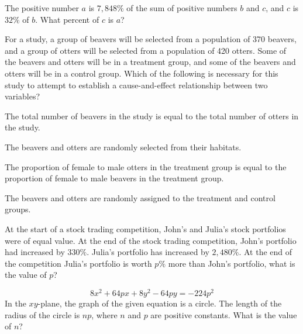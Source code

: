 \vfill
\clearpage
\noindent\begin{minipage}{\linewidth}
\par\smallskip
The positive number $a$ is $7{,}848\%$ of the sum of positive numbers $b$ and $c$, and $c$ is $32\%$ of $b$. What percent of $c$ is $a$?
\end{minipage}
\vfill
\noindent\begin{minipage}{\linewidth}
\par\smallskip
For a study, a group of beavers will be selected from a population of 370 beavers, and a group of otters will be selected from a population of 420 otters. Some of the beavers and otters will be in a treatment group, and some of the beavers and otters will be in a control group. Which of the following is necessary for this study to attempt to establish a cause-and-effect relationship between two variables?
\begin{satchoices}
  \item[A)] The total number of beavers in the study is equal to the total number of otters in the study.
  \item[B)] The beavers and otters are randomly selected from their habitats.
  \item[C)] The proportion of female to male otters in the treatment group is equal to the proportion of female to male beavers in the treatment group.
  \item[D)] The beavers and otters are randomly assigned to the treatment and control groups.
\end{satchoices}
\end{minipage}
\vfill
\noindent\begin{minipage}{\linewidth}
\par\smallskip
At the start of a stock trading competition, John's and Julia's stock portfolios were of equal value. At the end of the stock trading competition, John's portfolio had increased by $330\%$. Julia's portfolio has increased by $2{,}480\%$. At the end of the competition Julia's portfolio is worth $p\%$ more than John's portfolio, what is the value of $p$?
\end{minipage}
\vfill
\clearpage
{}
\noindent\begin{minipage}{\linewidth}
\par\smallskip
$$8x^2+64px+8y^2-64py=-224p^2$$ In the $xy$-plane, the graph of the given equation is a circle. The length of the radius of the circle is $np$, where $n$ and $p$ are positive constants. What is the value of $n$?
\end{minipage}
